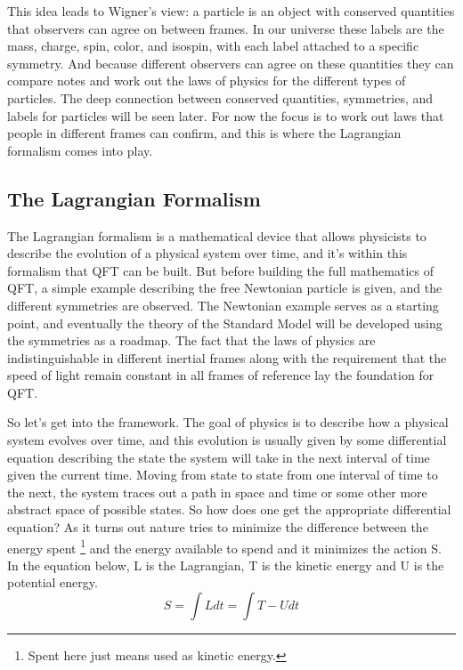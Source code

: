 This idea leads to Wigner's view: a particle is an object with conserved quantities that observers can agree on between frames. In our universe these labels are the mass, charge, spin, color, and isospin, with each label attached to a specific symmetry. And because different observers can agree on these quantities they can compare notes and work out the laws of physics for the different types of particles. The deep connection between conserved quantities, symmetries, and labels for particles will be seen later. For now the focus is to work out laws that people in different frames can confirm, and this is where the Lagrangian formalism comes into play. 

\subsection{The Lagrangian Formalism}

The Lagrangian formalism is a mathematical device that allows physicists to describe the evolution of a physical system over time, and it's within this formalism that QFT can be built. But before building the full mathematics of QFT, a simple example describing the free Newtonian particle is given, and the different symmetries are observed. The Newtonian example serves as a starting point, and eventually the theory of the Standard Model will be developed using the symmetries as a roadmap. The fact that the laws of physics are indistinguishable in different inertial frames along with the requirement that the speed of light remain constant in all frames of reference lay the foundation for QFT. 

So let's get into the framework. The goal of physics is to describe how a physical system evolves over time, and this evolution is usually given by some differential equation describing the state the system will take in the next interval of time given the current time. Moving from state to state from one interval of time to the next, the system traces out a path in space and time or some other more abstract space of possible states. So how does one get the appropriate differential equation? As it turns out nature tries to minimize the difference between the energy spent \footnote{Spent here just means used as kinetic energy.} and the energy available to spend and it minimizes the action S. In the equation below, L is the Lagrangian, T is the kinetic energy and U is the potential energy.     
\begin{equation}
S = \int L dt = \int T - U dt
\end{equation}

